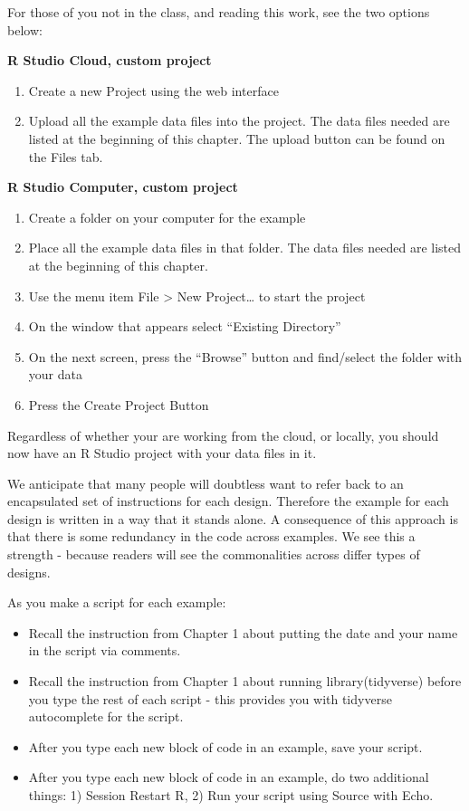 \documentclass[
]{krantz}
\begin{document}
For those of you not in the class, and reading this work, see the two options below:

\textbf{R Studio Cloud, custom project}

\begin{enumerate}
\def\labelenumi{\arabic{enumi}.}
\item
  Create a new Project using the web interface
\item
  Upload all the example data files into the project. The data files needed are listed at the beginning of this chapter. The upload button can be found on the Files tab.
\end{enumerate}

\textbf{R Studio Computer, custom project}

\begin{enumerate}
\def\labelenumi{\arabic{enumi}.}
\item
  Create a folder on your computer for the example
\item
  Place all the example data files in that folder. The data files needed are listed at the beginning of this chapter.
\item
  Use the menu item File \textgreater{} New Project\ldots{} to start the project
\item
  On the window that appears select ``Existing Directory''
\item
  On the next screen, press the ``Browse'' button and find/select the folder with your data
\item
  Press the Create Project Button
\end{enumerate}

Regardless of whether your are working from the cloud, or locally, you should now have an R Studio project with your data files in it.

We anticipate that many people will doubtless want to refer back to an encapsulated set of instructions for each design. Therefore the example for each design is written in a way that it stands alone. A consequence of this approach is that there is some redundancy in the code across examples. We see this a strength - because readers will see the commonalities across differ types of designs.

As you make a script for each example:

\begin{itemize}
\item
  Recall the instruction from Chapter 1 about putting the date and your name in the script via comments.
\item
  Recall the instruction from Chapter 1 about running library(tidyverse) before you type the rest of each script - this provides you with tidyverse autocomplete for the script.
\item
  After you type each new block of code in an example, save your script.
\item
  After you type each new block of code in an example, do two additional things: 1) Session Restart R, 2) Run your script using Source with Echo.
\end{itemize}
\end{document}
